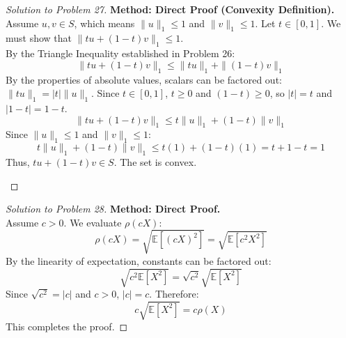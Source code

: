 \documentclass[11pt]{article}
\begin{document}
\begin{proof}[Solution to Problem 27]
    \textbf{Method: Direct Proof (Convexity Definition).} \\
    Assume $u, v \in S$, which means $\|u\|_1 \le 1$ and $\|v\|_1 \le 1$. Let $t \in [0, 1]$. We must show that $\|tu + (1-t)v\|_1 \le 1$. \\
    By the Triangle Inequality established in Problem 26:
    \[ \|tu + (1-t)v\|_1 \le \|tu\|_1 + \|(1-t)v\|_1 \]
    By the properties of absolute values, scalars can be factored out: $\|tu\|_1 = |t|\|u\|_1$. Since $t \in [0, 1]$, $t \ge 0$ and $(1-t) \ge 0$, so $|t| = t$ and $|1-t| = 1-t$.
    \[ \|tu + (1-t)v\|_1 \le t\|u\|_1 + (1-t)\|v\|_1 \]
    Since $\|u\|_1 \le 1$ and $\|v\|_1 \le 1$:
    \[ t\|u\|_1 + (1-t)\|v\|_1 \le t(1) + (1-t)(1) = t + 1 - t = 1 \]
    Thus, $tu + (1-t)v \in S$. The set is convex.
    
    \begin{center}
    \end{center}
\end{proof}

\begin{proof}[Solution to Problem 28]
    \textbf{Method: Direct Proof.} \\
    Assume $c > 0$. We evaluate $\rho(cX)$:
    \[ \rho(cX) = \sqrt{\mathbb{E}[(cX)^2]} = \sqrt{\mathbb{E}[c^2 X^2]} \]
    By the linearity of expectation, constants can be factored out:
    \[ \sqrt{c^2 \mathbb{E}[X^2]} = \sqrt{c^2} \sqrt{\mathbb{E}[X^2]} \]
    Since $\sqrt{c^2} = |c|$ and $c > 0$, $|c| = c$. Therefore:
    \[ c\sqrt{\mathbb{E}[X^2]} = c\rho(X) \]
    This completes the proof.
\end{proof}
\end{document}
